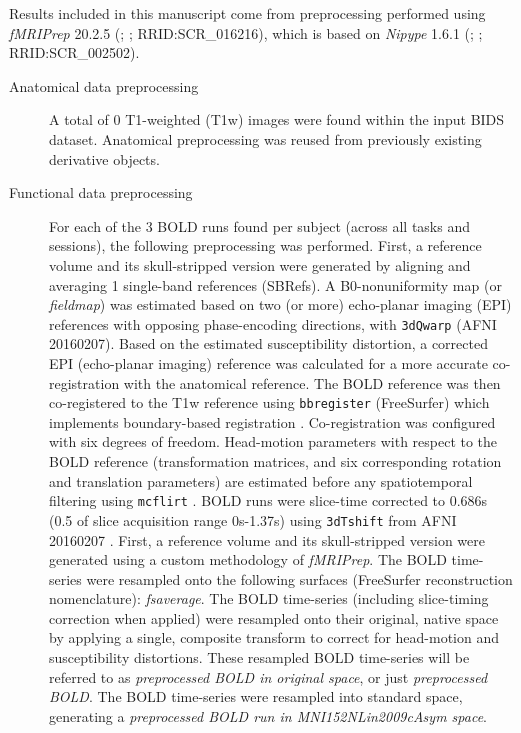 \documentclass[]{article}
\date{}
\begin{document}
Results included in this manuscript come from preprocessing performed
using \emph{fMRIPrep} 20.2.5 (\citet{fmriprep1}; \citet{fmriprep2};
RRID:SCR\_016216), which is based on \emph{Nipype} 1.6.1
(\citet{nipype1}; \citet{nipype2}; RRID:SCR\_002502).

\begin{description}
\item[Anatomical data preprocessing]
A total of 0 T1-weighted (T1w) images were found within the input BIDS
dataset. Anatomical preprocessing was reused from previously existing
derivative objects.
\item[Functional data preprocessing]
For each of the 3 BOLD runs found per subject (across all tasks and
sessions), the following preprocessing was performed. First, a reference
volume and its skull-stripped version were generated by aligning and
averaging 1 single-band references (SBRefs). A B0-nonuniformity map (or
\emph{fieldmap}) was estimated based on two (or more) echo-planar
imaging (EPI) references with opposing phase-encoding directions, with
\texttt{3dQwarp} \citet{afni} (AFNI 20160207). Based on the estimated
susceptibility distortion, a corrected EPI (echo-planar imaging)
reference was calculated for a more accurate co-registration with the
anatomical reference. The BOLD reference was then co-registered to the
T1w reference using \texttt{bbregister} (FreeSurfer) which implements
boundary-based registration \citep{bbr}. Co-registration was configured
with six degrees of freedom. Head-motion parameters with respect to the
BOLD reference (transformation matrices, and six corresponding rotation
and translation parameters) are estimated before any spatiotemporal
filtering using \texttt{mcflirt} \citep[FSL 5.0.9,][]{mcflirt}. BOLD
runs were slice-time corrected to 0.686s (0.5 of slice acquisition range
0s-1.37s) using \texttt{3dTshift} from AFNI 20160207
\citep[RRID:SCR\_005927]{afni}. First, a reference volume and its
skull-stripped version were generated using a custom methodology of
\emph{fMRIPrep}. The BOLD time-series were resampled onto the following
surfaces (FreeSurfer reconstruction nomenclature): \emph{fsaverage}. The
BOLD time-series (including slice-timing correction when applied) were
resampled onto their original, native space by applying a single,
composite transform to correct for head-motion and susceptibility
distortions. These resampled BOLD time-series will be referred to as
\emph{preprocessed BOLD in original space}, or just \emph{preprocessed
BOLD}. The BOLD time-series were resampled into standard space,
generating a \emph{preprocessed BOLD run in MNI152NLin2009cAsym space}.

\end{description}
\end{document}
